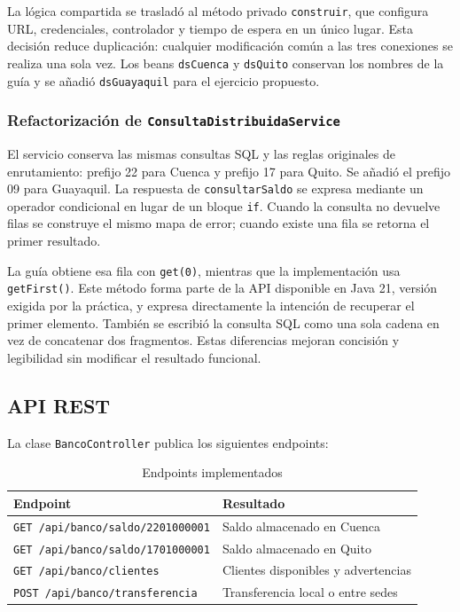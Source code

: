 \documentclass[12pt,a4paper]{article}
\begin{document}
La lógica compartida se trasladó al método privado \texttt{construir}, que configura URL, credenciales, controlador y tiempo de espera en un único lugar. Esta decisión reduce duplicación: cualquier modificación común a las tres conexiones se realiza una sola vez. Los beans \texttt{dsCuenca} y \texttt{dsQuito} conservan los nombres de la guía y se añadió \texttt{dsGuayaquil} para el ejercicio propuesto.

\subsubsection{Refactorización de \texttt{ConsultaDistribuidaService}}

El servicio conserva las mismas consultas SQL y las reglas originales de enrutamiento: prefijo 22 para Cuenca y prefijo 17 para Quito. Se añadió el prefijo 09 para Guayaquil. La respuesta de \texttt{consultarSaldo} se expresa mediante un operador condicional en lugar de un bloque \texttt{if}. Cuando la consulta no devuelve filas se construye el mismo mapa de error; cuando existe una fila se retorna el primer resultado.

La guía obtiene esa fila con \texttt{get(0)}, mientras que la implementación usa \texttt{getFirst()}. Este método forma parte de la API disponible en Java 21, versión exigida por la práctica, y expresa directamente la intención de recuperar el primer elemento. También se escribió la consulta SQL como una sola cadena en vez de concatenar dos fragmentos. Estas diferencias mejoran concisión y legibilidad sin modificar el resultado funcional.

\subsection{API REST}

La clase \texttt{BancoController} publica los siguientes endpoints:

\begin{table}[H]
  \centering
  \caption{Endpoints implementados}
  \begin{tabular}{p{8.2cm}p{5.2cm}}
    \toprule
    Endpoint & Resultado \\
    \midrule
    \texttt{GET /api/banco/saldo/2201000001} & Saldo almacenado en Cuenca \\
    \texttt{GET /api/banco/saldo/1701000001} & Saldo almacenado en Quito \\
    \texttt{GET /api/banco/clientes} & Clientes disponibles y advertencias \\
    \texttt{POST /api/banco/transferencia} & Transferencia local o entre sedes \\
    \bottomrule
  \end{tabular}
\end{table}
\end{document}
